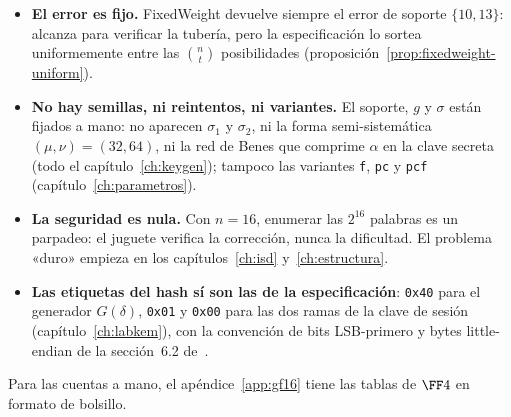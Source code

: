 \begin{itemize}[leftmargin=1.5em,itemsep=3pt]
  \item \textbf{El error es fijo.} \textsf{FixedWeight} devuelve
        siempre el error de soporte $\{10,13\}$: alcanza para
        verificar la tubería, pero la especificación lo sortea
        uniformemente entre las $\binom{n}{t}$ posibilidades
        (proposición~\ref{prop:fixedweight-uniform}).
  \item \textbf{No hay semillas, ni reintentos, ni variantes.} El
        soporte, $g$ y $\sigma$ están fijados a mano: no aparecen
        $\sigma_1$ y $\sigma_2$, ni la forma semi-sistemática
        $(\mu,\nu)=(32,64)$, ni la red de Benes que comprime
        $\alpha$ en la clave secreta (todo el
        capítulo~\ref{ch:keygen}); tampoco las variantes
        \texttt{f}, \texttt{pc} y \texttt{pcf}
        (capítulo~\ref{ch:parametros}).
  \item \textbf{La seguridad es nula.} Con $n=16$, enumerar las
        $2^{16}$ palabras es un parpadeo: el juguete verifica la
        corrección, nunca la dificultad. El problema «duro» empieza
        en los capítulos~\ref{ch:isd} y~\ref{ch:estructura}.
  \item \textbf{Las etiquetas del hash sí son las de la
        especificación}: \texttt{0x40} para el generador
        $G(\delta)$, \texttt{0x01} y \texttt{0x00} para las dos
        ramas de la clave de sesión (capítulo~\ref{ch:labkem}), con
        la convención de bits LSB-primero y bytes little-endian de
        la sección~6.2 de~\cite{cmspec}.
\end{itemize}

\medskip
\noindent Para las cuentas a mano, el apéndice~\ref{app:gf16} tiene
las tablas de $\FF4$ en formato de bolsillo.
